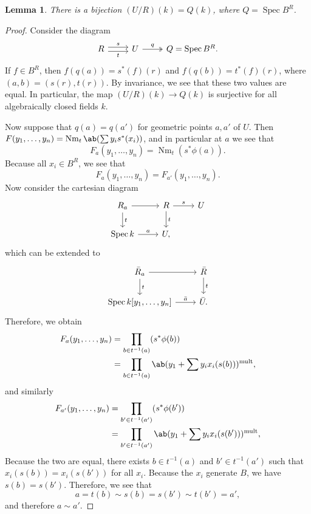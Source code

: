 \documentclass{amsart}
\newtheorem{lem}[thm]{Lemma}
\theoremstyle{definition}
\theoremstyle{remark}
\theoremstyle{plain}
\theoremstyle{definition}
\theoremstyle{remark}
\newcommand{\on}[1]{\operatorname{#1}}
\newcommand{\1}{\mathbf{1}}
\newcommand{\2}{\mathbf{2}}
\newcommand{\3}{\mathbf{3}}
\DeclareMathOperator{\Spec}{Spec}
\begin{document}
    \begin{lem}
        There is a bijection \((U/R)(k) = Q(k)\), where \(Q = \Spec B^R\).
    \end{lem}
    \begin{proof}
        Consider the diagram
        \begin{equation*}
        \begin{tikzcd}
            R \ar[shift left]{r}{s} \ar[shift right]{r}[swap]{t} & U \ar[twoheadrightarrow]{r}{q} & Q = \Spec B^R.
        \end{tikzcd}
        \end{equation*}
        If \(f \in B^R\), then \(f(q(a)) = s^*(f)(r)\) and \(f(q(b)) = t^*(f)(r)\), where \((a,b) = (s(r), t(r))\). By invariance, we see that these two values are equal. In particular, the map \((U/R)(k) \to Q(k)\) is surjective for all algebraically closed fields \(k\).

        Now suppose that \(q(a) = q(a')\) for geometric points \(a, a'\) of \(U\). Then \(F(y_1, \ldots, y_n) = \on{Nm}_t\ab(\sum y_i s^* (x_i))\), and in particular at \(a\) we see that
        \[ F_a(y_1, \ldots, y_n) = \on{Nm}_t (s^* \phi(a)). \]
        Because all \(x_i \in B^R\), we see that 
        \[ F_a(y_1, \ldots, y_n) = F_{a'} (y_1, \ldots, y_n). \]
        Now consider the cartesian diagram
        \begin{equation*}
        \begin{tikzcd}
            R_a \ar{r} \ar{d}{t} & R \ar{r}{s} \ar{d}{t} & U \\
            \Spec k \ar{r}{a} & U,
        \end{tikzcd}
        \end{equation*}
        which can be extended to
        \begin{equation*}
        \begin{tikzcd}
            \bar{R}_a \ar{r} \ar{d}{t} & \bar{R} \ar{d}{t} \\
            \Spec {k[y_1, \ldots, y_n]} \ar{r}{\bar{a}} & \bar{U}.
        \end{tikzcd}
        \end{equation*}
        Therefore, we obtain
        \begin{align*}
            F_a (y_1, \ldots, y_n) &= \prod_{b \in t^{-1}(a)} (s^* \phi(b)) \\
            &= \prod_{b \in t^{-1}(a)} \ab(y_1 + \sum y_i x_i(s(b)))^{\on{mult}},
        \end{align*}
        and similarly
        \begin{align*}
            F_{a'} (y_1, \ldots, y_n) &= \prod_{b' \in t^{-1}(a')} (s^* \phi(b')) \\
            &= \prod_{b' \in t^{-1}(a')} \ab(y_1 + \sum y_i x_i(s(b')))^{\on{mult}},
        \end{align*}
        Because the two are equal, there exists \(b \in t^{-1}(a)\) and \(b' \in t^{-1}(a')\) such that \(x_i (s(b)) = x_i(s(b'))\) for all \(x_i\). Because the \(x_i\) generate \(B\), we have \(s(b) = s(b')\). Therefore, we see that
        \[ a = t(b) \sim s(b) = s(b') \sim t(b') = a', \]
        and therefore \(a \sim a'\).
    \end{proof}
\end{document}
